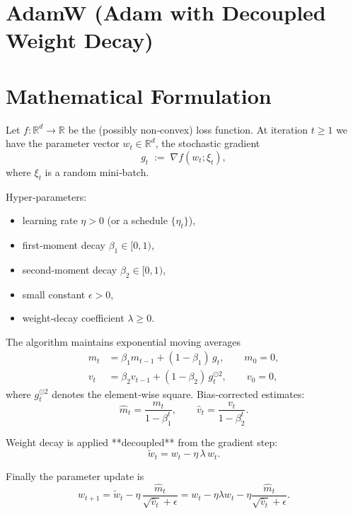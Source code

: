 \documentclass{article}
\newcommand{\R}{\mathbb{R}}
\begin{document}
\section*{AdamW (Adam with Decoupled Weight Decay)}

\section*{Mathematical Formulation}
Let $f:\R^{d}\rightarrow\R$ be the (possibly non‑convex) loss function.  
At iteration $t\ge 1$ we have the parameter vector $w_{t}\in\R^{d}$, the stochastic gradient
\[
g_{t}\;:=\;\nabla f(w_{t};\xi_{t}),
\]
where $\xi_{t}$ is a random mini‑batch.  

Hyper‑parameters:
\begin{itemize}[nosep]
  \item learning rate $\eta>0$ (or a schedule $\{\eta_{t}\}$),
  \item first‑moment decay $\beta_{1}\in[0,1)$,
  \item second‑moment decay $\beta_{2}\in[0,1)$,
  \item small constant $\epsilon>0$,
  \item weight‑decay coefficient $\lambda\ge0$.
\end{itemize}

The algorithm maintains exponential moving averages
\[
\begin{aligned}
m_{t} &= \beta_{1} m_{t-1} + (1-\beta_{1})\,g_{t}, \qquad m_{0}=0,\\[4pt]
v_{t} &= \beta_{2} v_{t-1} + (1-\beta_{2})\,g_{t}^{\odot2}, \qquad v_{0}=0,
\end{aligned}
\]
where $g_{t}^{\odot2}$ denotes the element‑wise square.  
Bias‑corrected estimates:
\[
\hat m_{t}= \frac{m_{t}}{1-\beta_{1}^{t}},\qquad
\hat v_{t}= \frac{v_{t}}{1-\beta_{2}^{t}} .
\]

Weight decay is applied **decoupled** from the gradient step:
\[
\tilde w_{t}= w_{t} - \eta\,\lambda\, w_{t}.
\]

Finally the parameter update is
\[
\boxed{
w_{t+1}= \tilde w_{t} - \eta\,
\frac{\hat m_{t}}{\sqrt{\hat v_{t}}+\epsilon}
= w_{t} - \eta\lambda w_{t}
      - \eta\frac{\hat m_{t}}{\sqrt{\hat v_{t}}+\epsilon}.
}
\]
\end{document}
